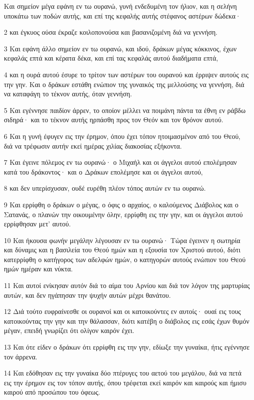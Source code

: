 \par Και σημείον μέγα εφάνη εν τω ουρανώ, γυνή ενδεδυμένη τον ήλιον, και η σελήνη υποκάτω των ποδών αυτής, και επί της κεφαλής αυτής στέφανος αστέρων δώδεκα·
\par 2 και έγκυος ούσα έκραζε κοιλοπονούσα και βασανιζομένη διά να γεννήση.
\par 3 Και εφάνη άλλο σημείον εν τω ουρανώ, και ιδού, δράκων μέγας κόκκινος, έχων κεφαλάς επτά και κέρατα δέκα, και επί τας κεφαλάς αυτού διαδήματα επτά,
\par 4 και η ουρά αυτού έσυρε το τρίτον των αστέρων του ουρανού και έρριψεν αυτούς εις την γην. Και ο δράκων εστάθη ενώπιον της γυναικός της μελλούσης να γεννήση, διά να καταφάγη το τέκνον αυτής, όταν γεννήση.
\par 5 Και εγέννησε παιδίον άρρεν, το οποίον μέλλει να ποιμάνη πάντα τα έθνη εν ράβδω σιδηρά· και το τέκνον αυτής ηρπάσθη προς τον Θεόν και τον θρόνον αυτού.
\par 6 Και η γυνή έφυγεν εις την έρημον, όπου έχει τόπον ητοιμασμένον από του Θεού, διά να τρέφωσιν αυτήν εκεί ημέρας χιλίας διακοσίας εξήκοντα.
\par 7 Και έγεινε πόλεμος εν τω ουρανώ· ο Μιχαήλ και οι άγγελοι αυτού επολέμησαν κατά του δράκοντος· και ο Δράκων επολέμησε και οι άγγελοι αυτού,
\par 8 και δεν υπερίσχυσαν, ουδέ ευρέθη πλέον τόπος αυτών εν τω ουρανώ.
\par 9 Και ερρίφθη ο δράκων ο μέγας, ο όφις ο αρχαίος, ο καλούμενος Διάβολος και ο Σατανάς, ο πλανών την οικουμένην όλην, ερρίφθη εις την γην, και οι άγγελοι αυτού ερρίφθησαν μετ' αυτού.
\par 10 Και ήκουσα φωνήν μεγάλην λέγουσαν εν τω ουρανώ· Τώρα έγεινεν η σωτηρία και δύναμις και η βασιλεία του Θεού ημών και η εξουσία τον Χριστού αυτού, διότι κατερρίφθη ο κατήγορος των αδελφών ημών, ο κατηγορών αυτούς ενώπιον του Θεού ημών ημέραν και νύκτα.
\par 11 Και αυτοί ενίκησαν αυτόν διά το αίμα του Αρνίου και διά τον λόγον της μαρτυρίας αυτών, και δεν ηγάπησαν την ψυχήν αυτών μέχρι θανάτου.
\par 12 Διά τούτο ευφραίνεσθε οι ουρανοί και οι κατοικούντες εν αυτοίς· ουαί εις τους κατοικούντας την γην και την θάλασσαν, διότι κατέβη ο διάβολος εις εσάς έχων θυμόν μέγαν, επειδή γνωρίζει ότι ολίγον καιρόν έχει.
\par 13 Και ότε είδεν ο δράκων ότι ερρίφθη εις την γην, εδίωξε την γυναίκα, ήτις εγέννησε τον άρρενα.
\par 14 Και εδόθησαν εις την γυναίκα δύο πτέρυγες του αετού του μεγάλου, διά να πετά εις την έρημον εις τον τόπον αυτής, όπου τρέφεται εκεί καιρόν και καιρούς και ήμισυ καιρού από προσώπου του όφεως.
